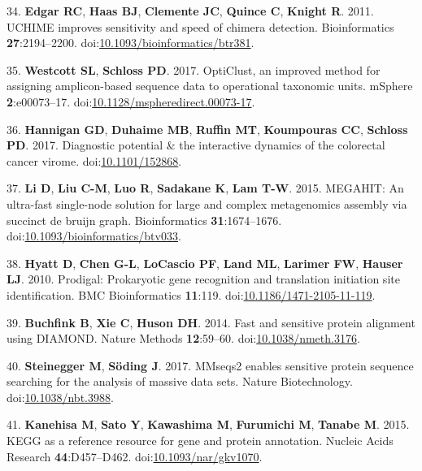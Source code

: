 \documentclass[11pt,]{article}
\begin{document}
\hypertarget{ref-Edgar2011}{}
34. \textbf{Edgar RC}, \textbf{Haas BJ}, \textbf{Clemente JC},
\textbf{Quince C}, \textbf{Knight R}. 2011. UCHIME improves sensitivity
and speed of chimera detection. Bioinformatics \textbf{27}:2194--2200.
doi:\href{https://doi.org/10.1093/bioinformatics/btr381}{10.1093/bioinformatics/btr381}.

\hypertarget{ref-opticlust_westcott2017}{}
35. \textbf{Westcott SL}, \textbf{Schloss PD}. 2017. OptiClust, an
improved method for assigning amplicon-based sequence data to
operational taxonomic units. mSphere \textbf{2}:e00073--17.
doi:\href{https://doi.org/10.1128/mspheredirect.00073-17}{10.1128/mspheredirect.00073-17}.

\hypertarget{ref-Hannigan2017}{}
36. \textbf{Hannigan GD}, \textbf{Duhaime MB}, \textbf{Ruffin MT},
\textbf{Koumpouras CC}, \textbf{Schloss PD}. 2017. Diagnostic potential
\& the interactive dynamics of the colorectal cancer virome.
doi:\href{https://doi.org/10.1101/152868}{10.1101/152868}.

\hypertarget{ref-Li2015}{}
37. \textbf{Li D}, \textbf{Liu C-M}, \textbf{Luo R}, \textbf{Sadakane
K}, \textbf{Lam T-W}. 2015. MEGAHIT: An ultra-fast single-node solution
for large and complex metagenomics assembly via succinct de bruijn
graph. Bioinformatics \textbf{31}:1674--1676.
doi:\href{https://doi.org/10.1093/bioinformatics/btv033}{10.1093/bioinformatics/btv033}.

\hypertarget{ref-Hyatt2010}{}
38. \textbf{Hyatt D}, \textbf{Chen G-L}, \textbf{LoCascio PF},
\textbf{Land ML}, \textbf{Larimer FW}, \textbf{Hauser LJ}. 2010.
Prodigal: Prokaryotic gene recognition and translation initiation site
identification. BMC Bioinformatics \textbf{11}:119.
doi:\href{https://doi.org/10.1186/1471-2105-11-119}{10.1186/1471-2105-11-119}.

\hypertarget{ref-Buchfink2014}{}
39. \textbf{Buchfink B}, \textbf{Xie C}, \textbf{Huson DH}. 2014. Fast
and sensitive protein alignment using DIAMOND. Nature Methods
\textbf{12}:59--60.
doi:\href{https://doi.org/10.1038/nmeth.3176}{10.1038/nmeth.3176}.

\hypertarget{ref-Steinegger2017}{}
40. \textbf{Steinegger M}, \textbf{Söding J}. 2017. MMseqs2 enables
sensitive protein sequence searching for the analysis of massive data
sets. Nature Biotechnology.
doi:\href{https://doi.org/10.1038/nbt.3988}{10.1038/nbt.3988}.

\hypertarget{ref-Kanehisa2015}{}
41. \textbf{Kanehisa M}, \textbf{Sato Y}, \textbf{Kawashima M},
\textbf{Furumichi M}, \textbf{Tanabe M}. 2015. KEGG as a reference
resource for gene and protein annotation. Nucleic Acids Research
\textbf{44}:D457--D462.
doi:\href{https://doi.org/10.1093/nar/gkv1070}{10.1093/nar/gkv1070}.
\end{document}
